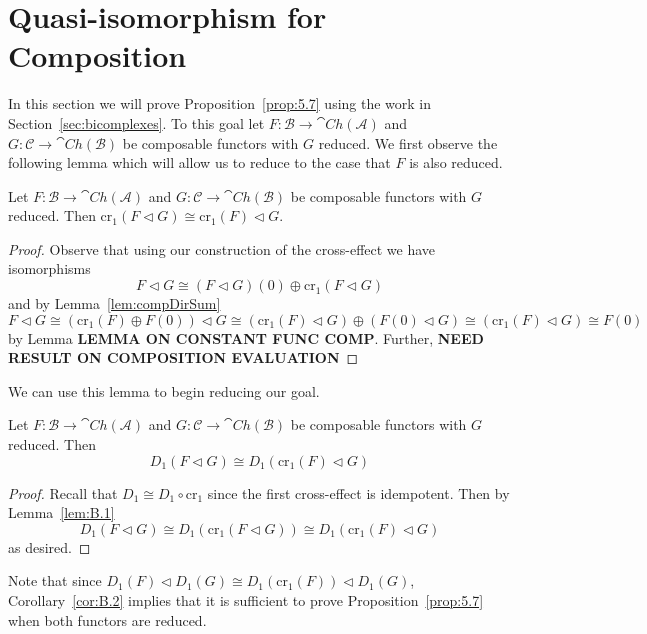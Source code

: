 \section{Quasi-isomorphism for Composition}\label{sec:Lotswork}

In this section we will prove Proposition~\ref{prop:5.7} using the work in Section~\ref{sec:bicomplexes}. To this goal let $F:\mathcal{B}\to \cat{Ch}(\mathcal{A})$ and $G:\mathcal{C}\to \cat{Ch}(\mathcal{B})$ be composable functors with $G$ reduced. We first observe the following lemma which will allow us to reduce to the case that $F$ is also reduced.

\begin{lem}[label=lem:B.1]
    Let $F:\mathcal{B}\to \cat{Ch}(\mathcal{A})$ and $G:\mathcal{C}\to \cat{Ch}(\mathcal{B})$ be composable functors with $G$ reduced. Then $\text{cr}_1(F\lhd G)\cong \text{cr}_1(F)\lhd G$.
\end{lem}
\begin{proof}
    Observe that using our construction of the cross-effect we have isomorphisms
    \begin{equation*}
        F\lhd G \cong (F\lhd G)(0) \oplus \text{cr}_1(F\lhd G)
    \end{equation*}
    and by Lemma~\ref{lem:compDirSum}
    \begin{equation*}
        F\lhd G\cong (\text{cr}_1(F)\oplus F(0))\lhd G \cong (\text{cr}_1(F)\lhd G)\oplus (F(0)\lhd G) \cong (\text{cr}_1(F)\lhd G)\cong F(0)
    \end{equation*}
    by Lemma \textbf{LEMMA ON CONSTANT FUNC COMP}. Further, \textbf{NEED RESULT ON COMPOSITION EVALUATION}
\end{proof}

We can use this lemma to begin reducing our goal.

\begin{cor}[label=cor:B.2]
    Let $F:\mathcal{B}\to \cat{Ch}(\mathcal{A})$ and $G:\mathcal{C}\to \cat{Ch}(\mathcal{B})$ be composable functors with $G$ reduced. Then
    \begin{equation*}
        D_1(F\lhd G)\cong D_1(\text{cr}_1(F)\lhd G)
    \end{equation*}
\end{cor}
\begin{proof}
    Recall that $D_1\cong D_1\circ \text{cr}_1$ since the first cross-effect is idempotent. Then by Lemma~\ref{lem:B.1}
    \begin{equation*}
        D_1(F\lhd G) \cong D_1(\text{cr}_1(F\lhd G)) \cong D_1(\text{cr}_1(F)\lhd G)
    \end{equation*}
    as desired.
\end{proof}

Note that since $D_1(F)\lhd D_1(G)\cong D_1(\text{cr}_1(F))\lhd D_1(G)$, Corollary~\ref{cor:B.2} implies that it is sufficient to prove Proposition~\ref{prop:5.7} when both functors are reduced. 